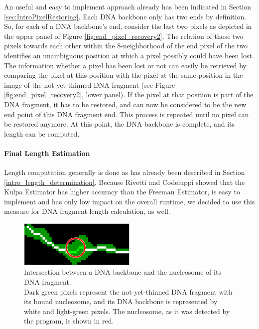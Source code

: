 \documentclass{article}
\begin{document}
An useful and easy to implement approach already has been indicated in Section \ref{sec:IntroPixelRestoring}. Each DNA backbone only has two ends by definition. So, for each of a DNA backbone's end, consider the last two pixels as depicted in the upper panel of Figure \ref{fig:end_pixel_recovery2}. The relation of those two pixels towards each other within the 8-neighborhood of the end pixel of the two identifies an unambiguous position at which a pixel possibly could have been lost. The information whether a pixel has been lost or not can easily be retrieved by comparing the pixel at this position with the pixel at the same position in the image of the not-yet-thinned DNA fragment (see Figure \ref{fig:end_pixel_recovery2}, lower panel). If the pixel at that position is part of the DNA fragment, it has to be restored, and can now be considered to be the new end point of this DNA fragment end. This process is repeated until no pixel can be restored anymore. At this point, the DNA backbone is complete, and its length can be computed.


\paragraph{Final Length Estimation}\label{sec:Final Length Estimation}
Length computation generally is done as has already been described in Section \ref{intro_length_determination}. Because Rivetti and Codeluppi \cite{rivetti2001accurate} showed that the Kulpa Estimator has higher accuracy than the Freeman Estimator, is easy to implement and has only low impact on the overall runtime, we decided to use this measure for DNA fragment length calculation, as well.
\begin{figure}[htb!]
	\centering
	\includegraphics[width = 0.5\textwidth]{length_calc_two_arms.png}
	\caption{Intersection between a DNA backbone and the nucleosome of its DNA fragment.\\
		Dark green pixels represent the not-yet-thinned DNA fragment with its bound nucleosome, and its DNA backbone is represented by white and light-green pixels. The nucleosome, as it was detected by the program, is shown in red.}
	\label{fig: length_calc_two_arms}
\end{figure}
\end{document}
